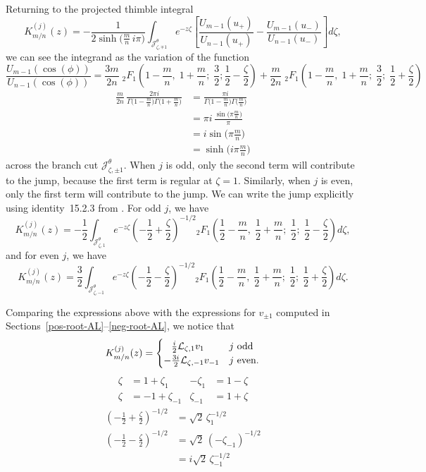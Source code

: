 \documentclass{article}
\newcommand{\laplace}{\mathcal{L}}
\theoremstyle{definition}
\theoremstyle{plain}
\newenvironment{verify}{\color{ForestGreen}}{\color{black}}
\begin{document}
Returning to the projected thimble integral
\[ K^{(j)}_{m/n}(z) = -\frac{1}{2\sinh\big(\tfrac{m}{n}\,i\pi\big)} \int_{\mathcal{J}^\theta_{\zeta, \mp 1}} e^{-z\zeta} \left[ \frac{U_{m-1}(u_+)}{U_{n-1}(u_+)} - \frac{U_{m-1}(u_-)}{U_{n-1}(u_-)} \right] d\zeta, \]
we can see the integrand as the variation of the function
\[ \frac{U_{m-1}(\cos(\phi))}{U_{n-1}(\cos(\phi))} = \frac{3m}{2n}\;{}_2F_1\left(1 - \frac{m}{n},\;1 + \frac{m}{n};\;\frac{3}{2};\frac{1}{2} - \frac{\zeta}{2}\right) + \frac{m}{2n}\;{}_2F_1\left(1 - \frac{m}{n},\;1 + \frac{m}{n};\;\frac{3}{2};\;\frac{1}{2} + \frac{\zeta}{2}\right) \]
\begin{verify}
\begin{align*}
\frac{m}{2n}\,\frac{2\pi i}{\Gamma\big(1-\tfrac{m}{n}\big)\Gamma\big(1+\tfrac{m}{n}\big)} & = \frac{\pi i}{\Gamma\big(1-\tfrac{m}{n}\big)\Gamma\big(\tfrac{m}{n}\big)} \\
& = \pi i\,\frac{\sin\big(\pi\tfrac{m}{n}\big)}{\pi} \\
& = i \sin\big(\pi\tfrac{m}{n}\big) \\
&= \sinh\big(i\pi\tfrac{m}{n}\big)
\end{align*}
\end{verify}
across the branch cut $\mathcal{J}^\theta_{\zeta, \pm 1}$. When $j$ is odd, only the second term will contribute to the jump, because the first term is regular at $\zeta = 1$. Similarly, when $j$ is even, only the first term will contribute to the jump. We can write the jump explicitly using identity~15.2.3 from \cite{dlmf}. For odd $j$, we have
\[ K^{(j)}_{m/n}(z) = -\frac{1}{2} \int_{\mathcal{J}^\theta_{\zeta, 1}} e^{-z\zeta} \left(-\frac{1}{2}+\frac{\zeta}{2}\right)^{-1/2} {}_2F_1\left(\frac{1}{2} - \frac{m}{n},\;\frac{1}{2} + \frac{m}{n};\;\frac{1}{2};\;\frac{1}{2} - \frac{\zeta}{2}\right) d\zeta, \]
and for even $j$, we have
\[ K^{(j)}_{m/n}(z) = \frac{3}{2} \int_{\mathcal{J}^\theta_{\zeta, -1}} e^{-z\zeta} \left(-\frac{1}{2}-\frac{\zeta}{2}\right)^{-1/2} {}_2F_1\left(\frac{1}{2} - \frac{m}{n},\;\frac{1}{2} + \frac{m}{n};\;\frac{1}{2};\;\frac{1}{2} + \frac{\zeta}{2}\right) d\zeta. \]

Comparing the expressions above with the expressions for $v_{\pm 1}$ computed in Sections~\ref{pos-root-AL}\;--\;\ref{neg-root-AL}, we notice that
\[ K^{(j)}_{m/n}(z) = \begin{cases}
\hphantom{-}\frac{i}{2}\laplace_{\zeta, 1} v_1 & j \text{ odd} \\
-\frac{3i}{2}\laplace_{\zeta, -1} v_{-1} & j \text{ even}.
\end{cases} \]
\begin{verify}
\begin{align*}
\zeta & = 1 + \zeta_1 & -\zeta_1 & = 1 - \zeta \\
\zeta & = -1 + \zeta_{-1} & \zeta_{-1} & = 1 + \zeta
\end{align*}
\begin{align*}
\left(-\frac{1}{2}+\frac{\zeta}{2}\right)^{-1/2} & = \sqrt{2}\,\zeta_1^{-1/2} \\
\left(-\frac{1}{2}-\frac{\zeta}{2}\right)^{-1/2} & = \sqrt{2}\,(-\zeta_{-1})^{-1/2} \\
& = i\sqrt{2}\,\zeta_{-1}^{-1/2}
\end{align*}
\end{verify}
%
\end{document}
